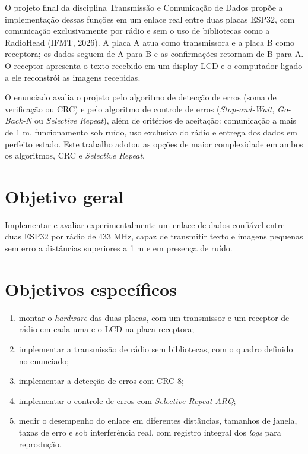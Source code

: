 \documentclass[12pt, oneside, a4paper, sumario=tradicional, chapter=TITLE, brazilian]{abntex2}
\begin{document}
O projeto final da disciplina Transmissão e Comunicação de Dados propõe a implementação dessas funções em um enlace real entre duas placas ESP32, com comunicação exclusivamente por rádio e sem o uso de bibliotecas como a RadioHead (IFMT, 2026). A placa A atua como transmissora e a placa B como receptora; os dados seguem de A para B e as confirmações retornam de B para A. O receptor apresenta o texto recebido em um display LCD e o computador ligado a ele reconstrói as imagens recebidas.

O enunciado avalia o projeto pelo algoritmo de detecção de erros (soma de verificação ou CRC) e pelo algoritmo de controle de erros (\textit{Stop-and-Wait}, \textit{Go-Back-N} ou \textit{Selective Repeat}), além de critérios de aceitação: comunicação a mais de 1 m, funcionamento sob ruído, uso exclusivo do rádio e entrega dos dados em perfeito estado. Este trabalho adotou as opções de maior complexidade em ambos os algoritmos, CRC e \textit{Selective Repeat}.

\section{Objetivo geral}

Implementar e avaliar experimentalmente um enlace de dados confiável entre duas ESP32 por rádio de 433 MHz, capaz de transmitir texto e imagens pequenas sem erro a distâncias superiores a 1 m e em presença de ruído.

\section{Objetivos específicos}

\begin{enumerate}[label=\alph*),leftmargin=1.9cm,itemsep=2pt]
  \item montar o \textit{hardware} das duas placas, com um transmissor e um receptor de rádio em cada uma e o LCD na placa receptora;
  \item implementar a transmissão de rádio sem bibliotecas, com o quadro definido no enunciado;
  \item implementar a detecção de erros com CRC-8;
  \item implementar o controle de erros com \textit{Selective Repeat ARQ};
  \item medir o desempenho do enlace em diferentes distâncias, tamanhos de janela, taxas de erro e sob interferência real, com registro integral dos \textit{logs} para reprodução.
\end{enumerate}
\end{document}
